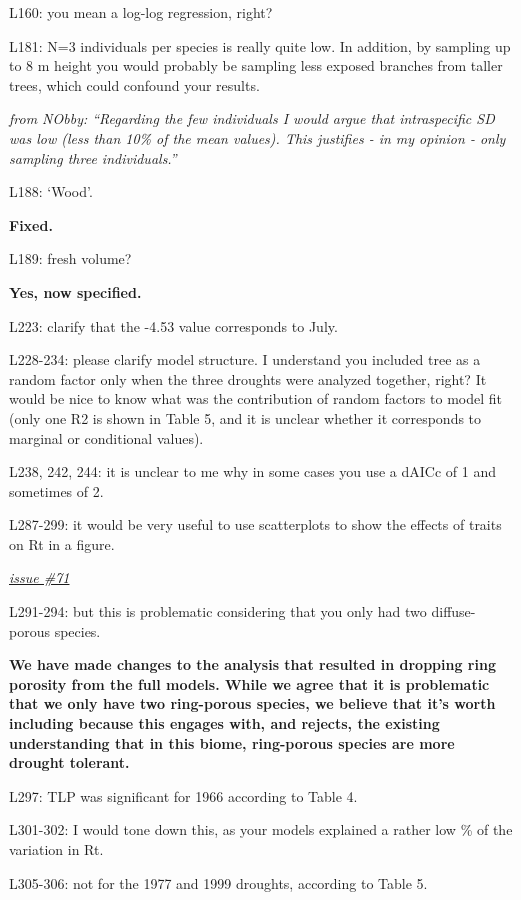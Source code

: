 \documentclass[
]{article}
\begin{document}
L160: you mean a log-log regression, right?

L181: N=3 individuals per species is really quite low. In addition, by
sampling up to 8 m height you would probably be sampling less exposed
branches from taller trees, which could confound your results.

\emph{from NObby: ``Regarding the few individuals I would argue that
intraspecific SD was low (less than 10\% of the mean values). This
justifies - in my opinion - only sampling three individuals.''}

L188: `Wood'.

\textbf{Fixed.}

L189: fresh volume?

\textbf{Yes, now specified.}

L223: clarify that the -4.53 value corresponds to July.

L228-234: please clarify model structure. I understand you included tree
as a random factor only when the three droughts were analyzed together,
right? It would be nice to know what was the contribution of random
factors to model fit (only one R2 is shown in Table 5, and it is unclear
whether it corresponds to marginal or conditional values).

L238, 242, 244: it is unclear to me why in some cases you use a dAICc of
1 and sometimes of 2.

L287-299: it would be very useful to use scatterplots to show the
effects of traits on Rt in a figure.

\href{https://github.com/SCBI-ForestGEO/McGregor_climate-sensitivity-variation/issues/71}{\emph{issue
\#71}}

L291-294: but this is problematic considering that you only had two
diffuse-porous species.

\textbf{We have made changes to the analysis that resulted in dropping
ring porosity from the full models. While we agree that it is
problematic that we only have two ring-porous species, we believe that
it's worth including because this engages with, and rejects, the
existing understanding that in this biome, ring-porous species are more
drought tolerant.}

L297: TLP was significant for 1966 according to Table 4.

L301-302: I would tone down this, as your models explained a rather low
\% of the variation in Rt.

L305-306: not for the 1977 and 1999 droughts, according to Table 5.
\end{document}
